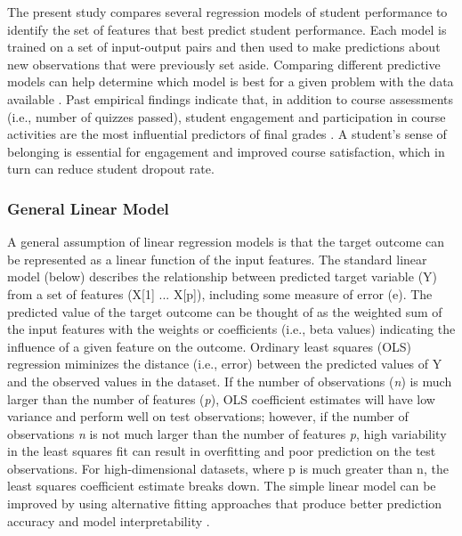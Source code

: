 \documentclass[sigconf]{acmart}
\begin{document}

The present study compares several regression models of student performance 
to identify the set of features that best predict student performance. Each 
model is trained on a set of input-output pairs and then used to make 
predictions about new observations that were previously set aside. Comparing 
different predictive models can help determine which model is best for a given 
problem with the data available \cite{raschka17}. Past empirical findings 
indicate that, in addition to course assessments (i.e., number of quizzes 
passed), student engagement and participation in course activities are the most 
influential predictors of final grades \cite{Papamitsiou14, romerozaldivar12}. 
A student's sense of belonging is essential for engagement and improved course 
satisfaction, which in turn can reduce student dropout rate. 

\subsubsection{General Linear Model} 

A general assumption of linear regression models is that the target outcome
can be represented as a linear function of the input features. The standard 
linear model (below) describes the relationship between predicted target 
variable (Y) from a set of features (X[1] ... X[p]), including some measure 
of error (e). The predicted value of the target outcome can be thought of as 
the weighted sum of the input features with the weights or coefficients 
(i.e., beta values) indicating the influence of a given feature on the outcome. 
Ordinary least squares (OLS) regression miminizes the distance (i.e., error) 
between the predicted values of Y and the observed values in the dataset. 
If the number of observations (\textit{n}) is much larger than the number of 
features (\textit{p}), OLS coefficient estimates will have low variance and 
perform well on test observations; however, if the number of observations 
\textit{n} is not much larger than the number of features \textit{p}, high 
variability in the least squares fit can result in overfitting and poor 
prediction on the test observations. For high-dimensional datasets, where 
p is much greater than n, the least squares coefficient estimate breaks down. 
The simple linear model can be improved by using alternative fitting 
approaches that produce better prediction accuracy and model interpretability 
\cite{jamesetal13}. 
\end{document}
